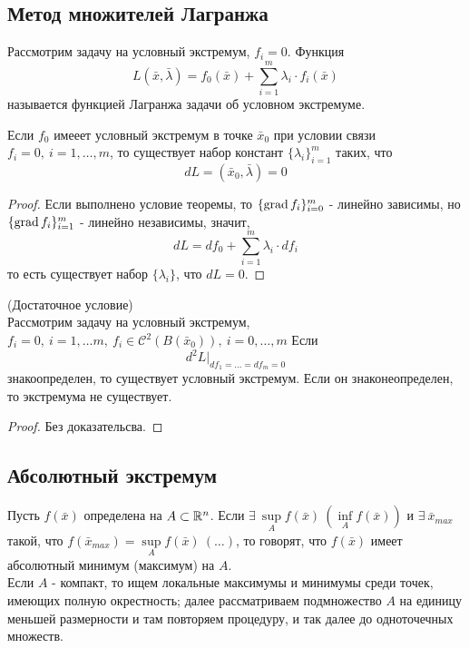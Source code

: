 \subsection{Метод множителей Лагранжа}
\begin{definition}
    Рассмотрим задачу на условный экстремум, $f_i=0$. Функция 
    \[L(\bar{x},\bar{\lambda})=f_0(\bar{x})+\sum\limits_{i=1}^{m}\lambda_i\cdot f_i(\bar{x})\]
    называется функцией Лагранжа задачи об условном экстремуме.
\end{definition} 
\begin{theorem}
    Если $f_0$ имееет условный экстремум в точке $\bar{x}_0$ при условии связи $f_i=0,\ i=1,\dots,m$, то существует набор констант $\{\lambda_i\}_{i=1}^m$ таких, что 
    \[dL=(\bar{x}_0,\bar{\lambda})=0\]
\end{theorem} 
\begin{proof}
    Если выполнено условие теоремы, то $\{\operatorname*{grad} f_i\}_{i=0}^m$ - линейно зависимы, но $\{\operatorname*{grad} f_i\}_{i=1}^m$ - линейно независимы, значит,
    \[dL=df_0+\sum\limits_{i=1}^{m}\lambda_i\cdot df_i\]
    то есть существует набор $\{\lambda_i\}$, что $dL=0$. 
\end{proof} 
\begin{theorem} (Достаточное условие)\\
    Рассмотрим задачу на условный экстремум, $f_i=0,\ i=1,\dots m,\ f_i\in \mathcal{C}^2(B(\bar{x}_0)),\ i=0,\dots,m$ Если
    \[d^2L|_{df_1=\dots=df_m=0}\]
    знакоопределен, то существует условный экстремум. Если он знаконеопределен, то экстремума не существует.
\end{theorem} 
\begin{proof}
    Без доказательсва.
\end{proof} 
\subsection{Абсолютный экстремум}
\begin{definition}
    Пусть $f(\bar{x})$ определена на $A\subset \mathbb{R}^n$. Если $\exists\ \sup\limits_A f(\bar{x})\ (\inf\limits_A f(\bar{x}))$ и $\exists\ \bar{x}_{max}$ такой, что $f(\bar{x}_{max})=\sup\limits_A f(\bar{x})\ (\dots)$, то говорят, что $f(\bar{x})$ имеет абсолютный минимум (максимум) на $A$.
    \\ Если $A$ - компакт, то ищем локальные максимумы и минимумы среди точек, имеющих полную окрестность; далее рассматриваем подмножество $A$ на единицу меньшей размерности и там повторяем процедуру, и так далее до одноточечных множеств.
\end{definition} 
